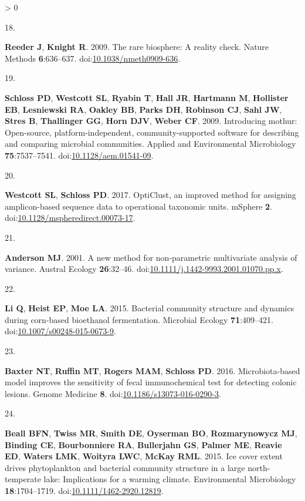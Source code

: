 \documentclass[
]{article}
\newlength{\cslhangindent}
\newlength{\csllabelwidth}
\newenvironment{CSLReferences}[3] %
 {%
  \setlength{\parindent}{0pt}
  \ifodd #1 \everypar{\setlength{\hangindent}{\cslhangindent}}\ignorespaces\fi
  \ifnum #2 > 0
  \setlength{\parskip}{#2\baselineskip}
  \fi
 }%
 {}
\newcommand{\CSLLeftMargin}[1]{\parbox[t]{\csllabelwidth}{#1}}
\newcommand{\CSLRightInline}[1]{\parbox[t]{\linewidth - \csllabelwidth}{#1}}
\begin{document}
\begin{CSLReferences}{0}{0}
\leavevmode\hypertarget{ref-Reeder2009}{}%
\CSLLeftMargin{18. }
\CSLRightInline{\textbf{Reeder J}, \textbf{Knight R}. 2009. The {{}}rare
biosphere{{}}: A reality check. Nature Methods \textbf{6}:636--637.
doi:\href{https://doi.org/10.1038/nmeth0909-636}{10.1038/nmeth0909-636}.}

\leavevmode\hypertarget{ref-Schloss2009}{}%
\CSLLeftMargin{19. }
\CSLRightInline{\textbf{Schloss PD}, \textbf{Westcott SL},
\textbf{Ryabin T}, \textbf{Hall JR}, \textbf{Hartmann M},
\textbf{Hollister EB}, \textbf{Lesniewski RA}, \textbf{Oakley BB},
\textbf{Parks DH}, \textbf{Robinson CJ}, \textbf{Sahl JW}, \textbf{Stres
B}, \textbf{Thallinger GG}, \textbf{Horn DJV}, \textbf{Weber CF}. 2009.
Introducing mothur: Open-source, platform-independent,
community-supported software for describing and comparing microbial
communities. Applied and Environmental Microbiology
\textbf{75}:7537--7541.
doi:\href{https://doi.org/10.1128/aem.01541-09}{10.1128/aem.01541-09}.}

\leavevmode\hypertarget{ref-Westcott2017}{}%
\CSLLeftMargin{20. }
\CSLRightInline{\textbf{Westcott SL}, \textbf{Schloss PD}. 2017.
{OptiClust}, an improved method for assigning amplicon-based sequence
data to operational taxonomic units. {mSphere} \textbf{2}.
doi:\href{https://doi.org/10.1128/mspheredirect.00073-17}{10.1128/mspheredirect.00073-17}.}

\leavevmode\hypertarget{ref-Anderson2001}{}%
\CSLLeftMargin{21. }
\CSLRightInline{\textbf{Anderson MJ}. 2001. A new method for
non-parametric multivariate analysis of variance. Austral Ecology
\textbf{26}:32--46.
doi:\href{https://doi.org/10.1111/j.1442-9993.2001.01070.pp.x}{10.1111/j.1442-9993.2001.01070.pp.x}.}

\leavevmode\hypertarget{ref-Li2015}{}%
\CSLLeftMargin{22. }
\CSLRightInline{\textbf{Li Q}, \textbf{Heist EP}, \textbf{Moe LA}. 2015.
Bacterial community structure and dynamics during corn-based bioethanol
fermentation. Microbial Ecology \textbf{71}:409--421.
doi:\href{https://doi.org/10.1007/s00248-015-0673-9}{10.1007/s00248-015-0673-9}.}

\leavevmode\hypertarget{ref-Baxter2016}{}%
\CSLLeftMargin{23. }
\CSLRightInline{\textbf{Baxter NT}, \textbf{Ruffin MT}, \textbf{Rogers
MAM}, \textbf{Schloss PD}. 2016. Microbiota-based model improves the
sensitivity of fecal immunochemical test for detecting colonic lesions.
Genome Medicine \textbf{8}.
doi:\href{https://doi.org/10.1186/s13073-016-0290-3}{10.1186/s13073-016-0290-3}.}

\leavevmode\hypertarget{ref-Beall2015}{}%
\CSLLeftMargin{24. }
\CSLRightInline{\textbf{Beall BFN}, \textbf{Twiss MR}, \textbf{Smith
DE}, \textbf{Oyserman BO}, \textbf{Rozmarynowycz MJ}, \textbf{Binding
CE}, \textbf{Bourbonniere RA}, \textbf{Bullerjahn GS}, \textbf{Palmer
ME}, \textbf{Reavie ED}, \textbf{Waters LMK}, \textbf{Woityra LWC},
\textbf{McKay RML}. 2015. Ice cover extent drives phytoplankton and
bacterial community structure in a large north-temperate lake:
Implications for a warming climate. Environmental Microbiology
\textbf{18}:1704--1719.
doi:\href{https://doi.org/10.1111/1462-2920.12819}{10.1111/1462-2920.12819}.}


\end{CSLReferences}
\end{document}
